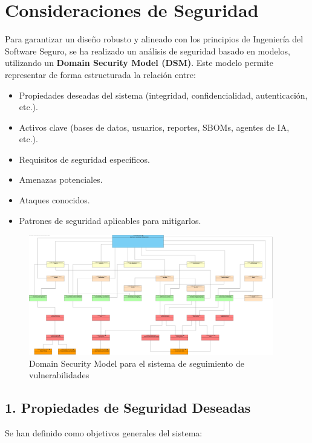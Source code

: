 \documentclass[11pt]{article}
\begin{document}
\section{Consideraciones de Seguridad}

Para garantizar un diseño robusto y alineado con los principios de Ingeniería del Software Seguro, se ha realizado un análisis de seguridad basado en modelos, utilizando un \textbf{Domain Security Model (DSM)}. Este modelo permite representar de forma estructurada la relación entre:

\begin{itemize}
    \item Propiedades deseadas del sistema (integridad, confidencialidad, autenticación, etc.).
    \item Activos clave (bases de datos, usuarios, reportes, SBOMs, agentes de IA, etc.).
    \item Requisitos de seguridad específicos.
    \item Amenazas potenciales.
    \item Ataques conocidos.
    \item Patrones de seguridad aplicables para mitigarlos.
\end{itemize}

\begin{figure}[H]
    \centering
    \includegraphics[width=0.95\textwidth]{images/DSM_Vulnerability_Tracking_System.png}
    \caption{Domain Security Model para el sistema de seguimiento de vulnerabilidades}
\end{figure}

\subsection*{1. Propiedades de Seguridad Deseadas}

Se han definido como objetivos generales del sistema:
\end{document}
